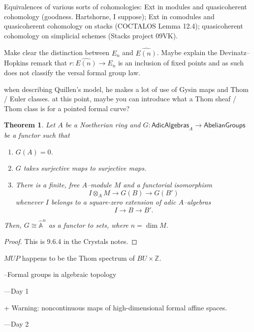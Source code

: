 \documentclass[12pt]{book}
\newcommand{\Z}{\mathbb Z}
\newcommand{\A}{\widehat{\mathbb{A}}}
\newcommand{\<}{\langle}
\renewcommand{\>}{\rangle}
\newcommand{\CatOf}[1]{\mathsf{#1}}
\numberwithin{equation}{section}
\theoremstyle{plain}
\newtheorem{theorem}[equation]{Theorem}
\theoremstyle{definition}
\theoremstyle{remark}
\begin{document}
Equivalences of various sorts of cohomologies: Ext in modules and quasicoherent cohomology (goodness. Hartshorne, I suppose); Ext in comodules and quasicoherent cohomology on stacks (COCTALOS Lemma 12.4); quasicoherent cohomology on simplicial schemes (Stacks project 09VK).

Make clear the distinction between $E_n$ and $\widehat{E(n)}$. Maybe explain the Devinatz--Hopkins remark that $r: \widehat{E(n)} \to E_n$ is an inclusion of fixed points and as such does not classify the versal formal group law.


when describing Quillen's model, he makes a lot of use of Gysin maps and Thom / Euler classes. at this point, maybe you can introduce what a Thom sheaf / Thom class is for a pointed formal curve?




\begin{theorem}\label{DetectingFormalVarieties}
Let $A$ be a Noetherian ring and $G: \CatOf{AdicAlgebras}_A \to \CatOf{AbelianGroups}$ be a functor such that
\begin{enumerate}
\item $G(A) = 0$.
\item $G$ takes surjective maps to surjective maps.
\item There is a finite, free $A$--module $M$ and a functorial isomorphism \[I \otimes_A M \to G(B) \to G(B')\] whenever $I$ belongs to a square-zero extension of adic $A$--algebras \[I \to B \to B'.\]
\end{enumerate}
Then, $G \cong \A^n$ as a functor to sets, where $n = \dim M$.
\end{theorem}
\begin{proof}
This is 9.6.4 in the Crystals notes.
\end{proof}



$MUP$ happens to be the Thom spectrum of $BU \times \Z$.







--Formal groups in algebraic topology

---Day 1

+ Warning: noncontinuous maps of high-dimensional formal affine spaces.

---Day 2
\end{document}
